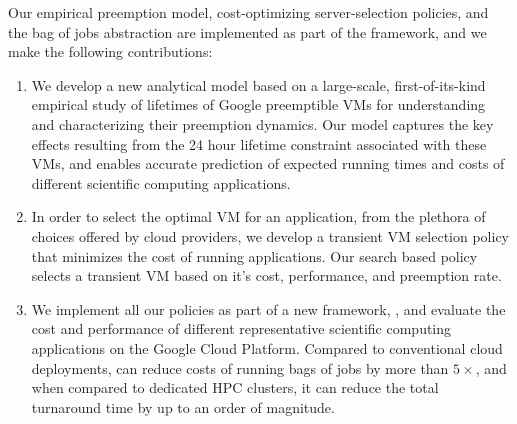 Our empirical preemption model, cost-optimizing server-selection policies, and the bag of jobs abstraction are implemented as part of the \sysname framework, and we make the following contributions:
\begin{enumerate}[leftmargin=12pt]
\item We develop a new analytical model based on a large-scale, first-of-its-kind empirical study of lifetimes of Google preemptible VMs for understanding and characterizing their preemption dynamics. Our model captures the key effects resulting from the 24 hour lifetime constraint associated with these VMs, and enables accurate prediction of expected running times and costs of different scientific computing applications.
  
\item In order to select the optimal VM for an application, from the plethora of choices offered by cloud providers, we develop a transient VM selection policy that minimizes the cost of running applications. Our search based policy selects a transient VM based on it's cost, performance, and preemption rate. 



\item We implement all our policies as part of a new framework, \sysname, and evaluate the cost and performance of different representative scientific computing  applications on the Google Cloud Platform. Compared to conventional cloud deployments, \sysname can reduce costs of running bags of jobs by more than $5\times$, and when compared to dedicated HPC clusters, it can reduce the total turnaround time by up to an order of magnitude. 

\end{enumerate}


